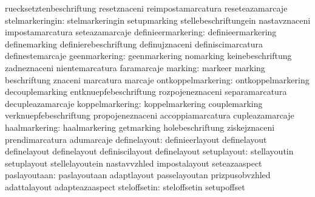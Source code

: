                                   ruecksetztenbeschriftung         resetznaceni
                                  reimpostamarcatura               reseteazamarcaje
                 stelmarkeringin: stelmarkeringin                  setupmarking
                                  stellebeschriftungein            nastavznaceni
                                  impostamarcatura                 seteazamarcaje
              definieermarkering: definieermarkering               definemarking
                                  definierebeschriftung            definujznaceni
                                  definiscimarcatura               definestemarcaje
                   geenmarkering: geenmarkering                    nomarking
                                  keinebeschriftung                zadneznaceni
                                  nientemarcatura                  faramarcaje
                         marking: markeer                          marking
                                  beschriftung                     znaceni
                                  marcatura                        marcaje
              ontkoppelmarkering: ontkoppelmarkering               decouplemarking
                                  entknuepfebeschriftung           rozpojeneznaceni
                                  separamarcatura                  decupleazamarcaje %
                 koppelmarkering: koppelmarkering                  couplemarking
                                  verknuepfebeschriftung           propojeneznaceni
                                  accoppiamarcatura                cupleazamarcaje %
                   haalmarkering: haalmarkering                    getmarking
                                  holebeschriftung                 ziskejznaceni
                                  prendimarcatura                  adumarcaje %
                    definelayout: definieerlayout                  definelayout
                                  definelayout                     definelayout
                                  definiscilayout                  definelayout %
                     setuplayout: stellayoutin                     setuplayout
                                  stellelayoutein                  nastavvzhled
                                  impostalayout                    seteazaaspect
                    paslayoutaan: paslayoutaan                     adaptlayout
                                  passelayoutan                    prizpusobvzhled
                                  adattalayout                     adapteazaaspect
                    steloffsetin: steloffsetin                     setupoffset
